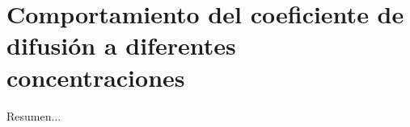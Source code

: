 \chapter{Comportamiento del coeficiente de difusión a diferentes concentraciones}\label{ch:comportamiento}
\thispagestyle{empty}

\vspace{50pt}

\begin{adjustwidth}{50pt}{50pt}
    Resumen...
\end{adjustwidth}

\clearpage
\newpage
\thispagestyle{empty}
\mbox{}
\newpage
